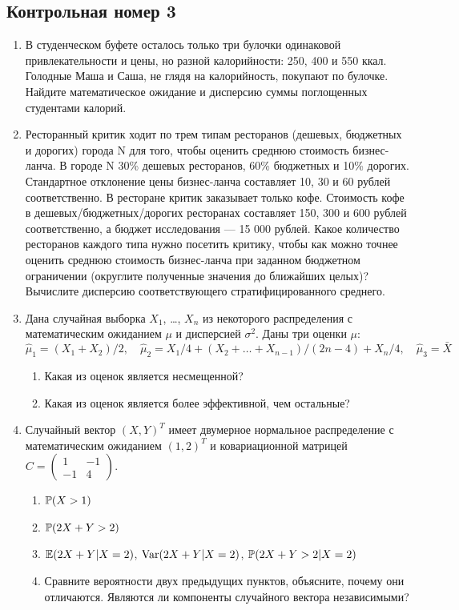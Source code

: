 \documentclass[12pt, a4paper]{article}\usepackage[]{graphicx}\usepackage[]{color}
\begin{document}



				\subsection{Контрольная номер 3}

				\begin{enumerate}

					\item В студенческом буфете осталось только три булочки одинаковой привлекательности и цены, но разной калорийности: 250, 400 и 550 ккал. Голодные Маша и Саша, не глядя на калорийность, покупают по булочке. Найдите математическое ожидание и дисперсию суммы поглощенных студентами калорий.

					\item Ресторанный критик ходит по трем типам ресторанов (дешевых, бюджетных и дорогих) города N для того, чтобы оценить среднюю стоимость бизнес-ланча. В городе N 30\% дешевых ресторанов, 60\% бюджетных  и 10\% дорогих. Стандартное отклонение цены бизнес-ланча составляет 10, 30 и 60 рублей соответственно. В ресторане критик заказывает только кофе.  Стоимость кофе в дешевых/бюджетных/дорогих ресторанах составляет 150, 300 и 600 рублей соответственно, а бюджет  исследования — 15 000 рублей. Какое количество ресторанов каждого типа нужно посетить критику, чтобы как можно точнее оценить среднюю стоимость бизнес-ланча при заданном бюджетном ограничении (округлите полученные значения до ближайших целых)? Вычислите дисперсию соответствующего стратифицированного среднего.

					\item Дана случайная выборка $X_1$, \ldots, $X_n$  из некоторого распределения с математическим ожиданием $\mu$ и дисперсией $\sigma^2$. Даны три оценки $\mu$:
					\[
					\hat\mu_1 = (X_1 + X_2)/2, \quad \hat\mu_2 = X_1/4 + (X_2 + \ldots + X_{n-1})/(2n-4) + X_n/4, \quad \hat\mu_3 = \bar X
					\]
					\begin{enumerate}
						\item Какая из оценок является несмещенной?
						\item Какая из оценок является более эффективной, чем остальные?
					\end{enumerate}

					\item Случайный вектор $(X, Y)^T$ имеет двумерное нормальное распределение с математическим ожиданием  $(1, 2)^T$ и ковариационной матрицей
					$C=\begin{pmatrix}
					1 & -1 \\
					-1 & 4
					\end{pmatrix}$.
					\begin{enumerate}
						\item $\P(X>1)$
						\item $\P(2X+Y>2)$
						\item $\E(2X+Y|X=2)$, $\Var(2X+Y|X=2)$, $\P(2X+Y>2|X=2)$
						\item Сравните вероятности двух предыдущих пунктов, объясните, почему они отличаются.
						Являются ли компоненты случайного вектора независимыми?
					\end{enumerate}



\end{enumerate}
\end{document}
